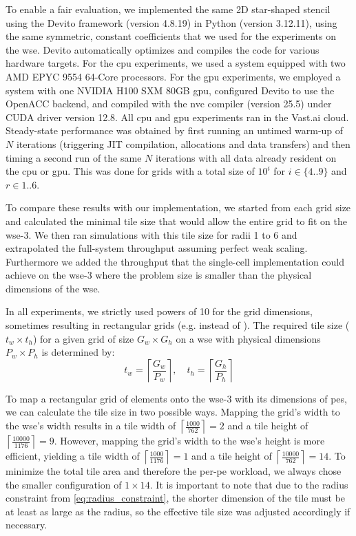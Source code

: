 To enable a fair evaluation, we implemented the same 2D star-shaped stencil using the Devito framework (version 4.8.19) in Python (version 3.12.11), using the same symmetric, constant coefficients that we used for the experiments on the \ac{wse}.
Devito automatically optimizes and compiles the code for various hardware targets.
For the \ac{cpu} experiments, we used a system equipped with two AMD EPYC 9554 64-Core processors. For the \ac{gpu} experiments, we employed a system with one NVIDIA H100 SXM 80GB \ac{gpu}, configured Devito to use the OpenACC backend, and compiled with the nvc compiler (version 25.5) under CUDA driver version 12.8. All \ac{cpu} and \ac{gpu} experiments ran in the Vast.ai cloud.
Steady-state performance was obtained by first running an untimed warm-up of $N$ iterations (triggering JIT compilation, allocations and data transfers) and then timing a second run of the same $N$ iterations with all data already resident on the \ac{cpu} or \ac{gpu}.
This was done for grids with a total size of $10^i$ for $i \in \{4..9\}$ and $r\in{1..6}$.

To compare these results with our implementation, we started from each grid size and calculated the minimal tile size that would allow the entire grid to fit on the \ac{wse}-3.
We then ran simulations with this tile size for radii 1 to 6 and extrapolated the full-system throughput assuming perfect weak scaling. Furthermore we added the throughput that the single-cell implementation could achieve on the \ac{wse}-3 where the problem size is smaller than the physical dimensions of the \ac{wse}.

In all experiments, we strictly used powers of 10 for the grid dimensions, sometimes resulting in rectangular grids (e.g.  instead of ). The required tile size ($t_w \times t_h$) for a given grid of size $G_w \times G_h$ on a \ac{wse} with physical dimensions $P_w \times P_h$ is determined by:
\begin{equation}
    t_w = \left\lceil \frac{G_w}{P_w} \right\rceil, \quad t_h = \left\lceil \frac{G_h}{P_h} \right\rceil
\end{equation}

To map a rectangular grid of  elements onto the \ac{wse}-3 with its dimensions of  \acp{pe}, we can calculate the tile size in two possible ways. Mapping the grid's width to the \ac{wse}'s width results in a tile width of $\left\lceil \frac{1000}{762} \right\rceil = 2$ and a tile height of $\left\lceil \frac{10000}{1176} \right\rceil = 9$. However, mapping the grid's width to the \ac{wse}'s height is more efficient, yielding a tile width of $\left\lceil \frac{1000}{1176} \right\rceil = 1$ and a tile height of $\left\lceil \frac{10000}{762} \right\rceil = 14$. To minimize the total tile area and therefore the per-\ac{pe} workload, we always chose the smaller configuration of $1 \times 14$. It is important to note that due to the radius constraint from \autoref{eq:radius_constraint}, the shorter dimension of the tile must be at least as large as the radius, so the effective tile size was adjusted accordingly if necessary.

